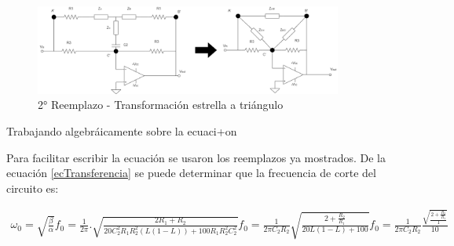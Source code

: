 \begin{figure}[H]
	\centering
	\includegraphics[width=0.9\textwidth]{../Ejercicio4-EcualizadorDeFase/Informe/2cambioTriangulo.png}
	\caption{2° Reemplazo - Transformación estrella a triángulo}
	\label{circuito_final} 
\end{figure}


Trabajando algebráicamente sobre la ecuaci+on




Para facilitar escribir la ecuación se usaron los reemplazos ya mostrados. De la ecuación \ref{ecTransferencia} se puede determinar que la frecuencia de corte del circuito es:


\begin{align}

	\begin{equation}
		\omega_0 = \sqrt{\frac{\beta}{\alpha}}
	\end{equation}
	
	\begin{equation}
		f_0 = \frac{1}{2\pi} . \sqrt{ \frac{2R_1 + R_2 }{ 20 C_2^2 R_1 R_2^2 (L (1-L)) + 100R_1 R_2^2C_2^2 } }
	\end{equation}
	
	\begin{equation}
		f_0 = \frac{1}{2\pi C_2 R_2} \sqrt{ \frac{2 + \frac{R_2}{R_1} }{ 20L(1-L) + 100 } }
	\end{equation}		
	\label{f0sinsimplificar}
	
	\begin{equation}
		f_0 = \frac{1}{2\pi C_2 R_2} \frac{ \sqrt{ \frac{2 + \frac{R_2}{R_1} }{ 1 } } }{ 10 }
	\end{equation}
	\label{f0final}
	
\end{align}

